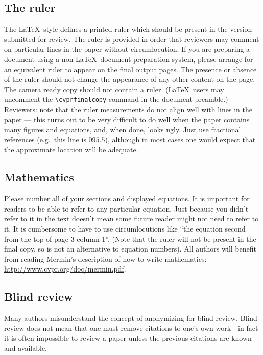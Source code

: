 \documentclass[10pt,twocolumn,letterpaper]{article}
\begin{document}
\subsection{The ruler}
The \LaTeX\ style defines a printed ruler which should be present in the
version submitted for review.  The ruler is provided in order that
reviewers may comment on particular lines in the paper without
circumlocution.  If you are preparing a document using a non-\LaTeX\
document preparation system, please arrange for an equivalent ruler to
appear on the final output pages.  The presence or absence of the ruler
should not change the appearance of any other content on the page.  The
camera ready copy should not contain a ruler. (\LaTeX\ users may uncomment
the \verb'\cvprfinalcopy' command in the document preamble.)  Reviewers:
note that the ruler measurements do not align well with lines in the paper
--- this turns out to be very difficult to do well when the paper contains
many figures and equations, and, when done, looks ugly.  Just use fractional
references (e.g.\ this line is $095.5$), although in most cases one would
expect that the approximate location will be adequate.

\subsection{Mathematics}

Please number all of your sections and displayed equations.  It is
important for readers to be able to refer to any particular equation.  Just
because you didn't refer to it in the text doesn't mean some future reader
might not need to refer to it.  It is cumbersome to have to use
circumlocutions like ``the equation second from the top of page 3 column
1''.  (Note that the ruler will not be present in the final copy, so is not
an alternative to equation numbers).  All authors will benefit from reading
Mermin's description of how to write mathematics: \url{http://www.cvpr.org/doc/mermin.pdf}.


\subsection{Blind review}

Many authors misunderstand the concept of anonymizing for blind
review.  Blind review does not mean that one must remove
citations to one's own work---in fact it is often impossible to
review a paper unless the previous citations are known and
available.
\end{document}
